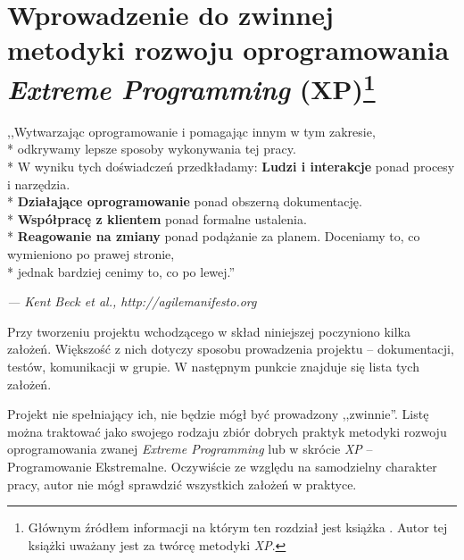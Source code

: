 \newpage
\chapter[Wprowadzenie do zwinnej metodyki rozwoju oprogramowania \textit{Extreme Programming} (XP)]{Wprowadzenie do zwinnej metodyki rozwoju oprogramowania \textit{Extreme Programming} (XP)\footnote{Głównym źródłem informacji na którym  ten rozdział jest książka \cite{Bec99}. Autor tej książki uważany jest za twórcę metodyki \textit{XP}.}}
\label{cha:ZMTO}

\begin{center}
    ,,Wytwarzając oprogramowanie i pomagając innym w tym zakresie,\\*
    odkrywamy lepsze sposoby wykonywania tej pracy.\\*
    W wyniku tych doświadczeń przedkładamy:\newline
    \newline
    \textbf{Ludzi i interakcje} ponad procesy i narzędzia.\\*
    \textbf{Działające oprogramowanie} ponad obszerną dokumentację.\\*
    \textbf{Współpracę z klientem} ponad formalne ustalenia.\\*
    \textbf{Reagowanie na zmiany} ponad podążanie za planem.\newline
    \newline
    Doceniamy to, co wymieniono po prawej stronie,\\*
    jednak bardziej cenimy to, co po lewej.''
\end{center}
\hfill \begin{small}\textit{--- Kent Beck et al., http://agilemanifesto.org}\end{small}

Przy tworzeniu projektu wchodzącego w skład niniejszej poczyniono kilka założeń. Większość z nich dotyczy sposobu prowadzenia projektu -- dokumentacji, testów, komunikacji w grupie. W następnym punkcie znajduje się lista tych założeń.

Projekt nie spełniający ich, nie będzie mógł być prowadzony ,,zwinnie''. Listę można traktować jako swojego rodzaju zbiór dobrych praktyk metodyki rozwoju oprogramowania zwanej \textit{Extreme Programming} lub w skrócie \textit{XP} -- Programowanie Ekstremalne. Oczywiście ze względu na samodzielny charakter pracy, autor nie mógł sprawdzić wszystkich założeń w praktyce.

